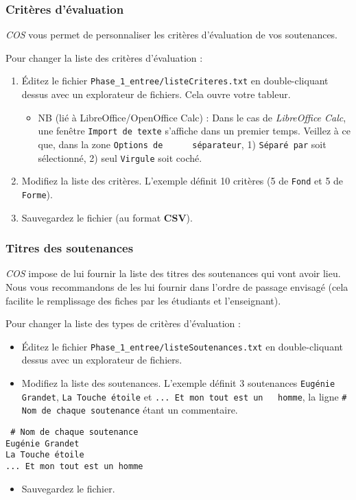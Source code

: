\documentclass[11pt]{article}
\begin{document}
\subsubsection{Critères d'évaluation}
\label{sec-4-1-3}
\emph{COS} vous permet de personnaliser les critères d'évaluation de vos
soutenances.

Pour changer la liste des critères d'évaluation :
\begin{enumerate}
\item Éditez le fichier \verb~Phase_1_entree/listeCriteres.txt~ en
double-cliquant dessus avec un explorateur de fichiers. Cela ouvre
votre tableur.
\begin{itemize}
\item NB (lié à LibreOffice/OpenOffice Calc) : Dans le cas de
\emph{LibreOffice Calc}, une fenêtre \verb~Import de texte~ s'affiche dans
un premier temps. Veillez à ce que, dans la zone \verb~Options de      séparateur~, 1) \verb~Séparé par~ soit sélectionné, 2) seul \verb~Virgule~
soit coché.
\end{itemize}
\item Modifiez la liste des critères. L'exemple définit 10 critères (5 de
\verb~Fond~ et 5 de \verb~Forme~).
\item Sauvegardez le fichier (au format \textbf{CSV}).
\end{enumerate}
\subsubsection{Titres des soutenances}
\label{sec-4-1-4}
\emph{COS} impose de lui fournir la liste des titres des soutenances qui
vont avoir lieu. Nous vous recommandons de les lui fournir dans
l'ordre de passage envisagé (cela facilite le remplissage des fiches
par les étudiants et l'enseignant).

Pour changer la liste des types de critères d'évaluation :
\begin{itemize}
\item Éditez le fichier \verb~Phase_1_entree/listeSoutenances.txt~ en
double-cliquant dessus avec un explorateur de fichiers.
\item Modifiez la liste des soutenances. L'exemple définit 3 soutenances
\verb~Eugénie Grandet~, \verb~La Touche étoile~ et \verb~... Et mon tout est un   homme~, la ligne \verb~# Nom de chaque soutenance~ étant un commentaire.
\end{itemize}
\begin{verbatim}
 # Nom de chaque soutenance
Eugénie Grandet
La Touche étoile
... Et mon tout est un homme
\end{verbatim}
\begin{itemize}
\item Sauvegardez le fichier.
\end{itemize}
\end{document}

